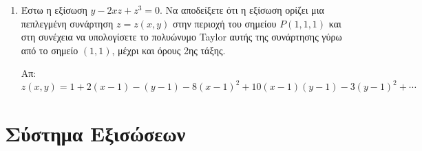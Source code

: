 \begin{enumerate}
    \item Έστω η εξίσωση $ y - 2xz + z^{3} = 0 $. Να αποδείξετε ότι η εξίσωση 
        ορίζει μια πεπλεγμένη συνάρτηση $ z = z(x,y) $ στην περιοχή του σημείου 
        $ P(1,1,1) $ και στη συνέχεια να υπολογίσετε το πολυώνυμο Taylor αυτής 
        της συνάρτησης γύρω από το σημείο $ (1,1) $, μέχρι και όρους 2ης τάξης. 

        \hfill Απ: $ z(x,y) =  1 + 2(x-1) - (y-1) - 8(x-1)^{2} + 10(x-1)(y-1) - 
        3(y-1)^{2} + \cdots $ 

\end{enumerate}


\section*{Σύστημα Εξισώσεων}

